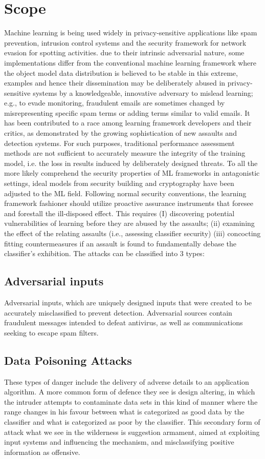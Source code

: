 \documentclass[journal,twoside,web]{ieeecolor}
\begin{document}
\section{Scope}
Machine learning is being used widely in privacy-sensitive applications like spam prevention, intrusion control systems and the security framework for network evasion for spotting activities. due to their intrinsic adversarial nature, some implementations diﬀer from the conventional machine learning framework where the object model data distribution is believed to be stable in this extreme, examples and hence their dissemination may be deliberately abused in privacy-sensitive systems by a knowledgeable, innovative adversary to mislead learning; e.g., to evade monitoring, fraudulent emails are sometimes changed by misrepresenting speciﬁc spam terms or adding terms similar to valid emails. It has been contributed to a race among learning framework developers and their critics, as demonstrated by the growing sophistication of new assaults and detection systems. For such purposes, traditional performance assessment methods are not suﬃcient to accurately measure the integrity of the training model, i.e. the loss in results induced by deliberately designed threats. To all the more likely comprehend the security properties of ML frameworks in antagonistic settings, ideal models from security building and cryptography have been adjusted to the ML ﬁeld. Following normal security conventions, the learning framework fashioner should utilize proactive assurance instruments that foresee and forestall the ill-disposed eﬀect. This requires (I) discovering potential vulnerabilities of learning before they are abused by the assaults; (ii) examining the eﬀect of the relating assaults (i.e., assessing classiﬁer security) (iii) concocting ﬁtting countermeasures if an assault is found to fundamentally debase the classiﬁer’s exhibition. The attacks can be classiﬁed into 3 types:
\subsection{Adversarial inputs}
Adversarial inputs, which are uniquely designed inputs that were created to be accurately misclassiﬁed to prevent detection. Adversarial sources contain fraudulent messages intended to defeat antivirus, as well as communications seeking to escape spam ﬁlters.

\subsection{Data Poisoning Attacks}
These types of danger include the delivery of adverse details to an application algorithm. A more common form of defence they see is design altering, in which the intruder attempts to contaminate data sets in this kind of manner where the range changes in his favour between what is categorized as good data by the classifier and what is categorized as poor by the classifier. This secondary form of attack what we see in the wilderness is suggestion armament, aimed at exploiting input systems and influencing the mechanism, and misclassifying positive information as offensive.
\end{document}
